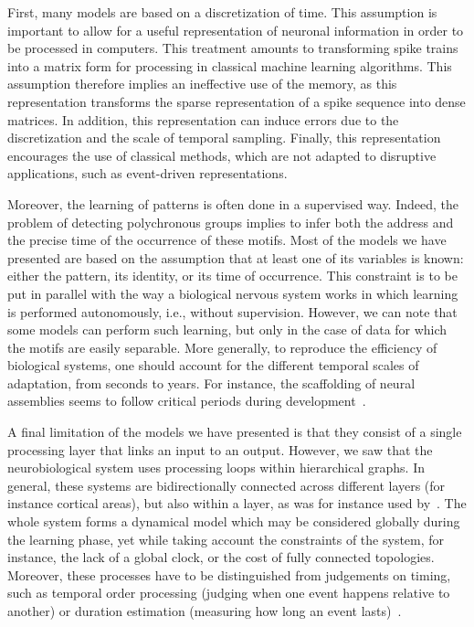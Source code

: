 \documentclass[brainsci, %
               review,accept,pdftex,moreauthors
               ]{Definitions/mdpi}
\begin{document}
First, many models are based on a discretization of time. This assumption is important to allow for a useful representation of neuronal information in order to be processed in computers. This treatment amounts to transforming spike trains into a matrix form for processing in classical machine learning algorithms. This assumption therefore implies an ineffective use of the memory, as this representation transforms the sparse representation of a spike sequence into dense matrices. In addition, this representation can induce errors due to the discretization and the scale of temporal sampling. Finally, this representation encourages the use of classical methods, which are not adapted to disruptive applications, such as event-driven representations.

Moreover, the learning of patterns is often done in a supervised way. Indeed, the problem of detecting polychronous groups implies to infer both the address and the precise time of the occurrence of these motifs. Most of the models we have presented are based on the assumption that at least one of its variables is known: either the pattern, its identity, or its time of occurrence. This constraint is to be put in parallel with the way a biological nervous system works in which learning is performed autonomously, i.e., without supervision. However, we can note that some models can perform such learning, but only in the case of data for which the motifs are easily separable. More generally, to reproduce the efficiency of biological systems, one should account for the different temporal scales of adaptation, from seconds to years. For instance, the scaffolding of neural assemblies seems to follow critical periods during development~\citep{dard_rapid_2022}.

A final limitation of the models we have presented is that they consist of a single processing layer that links an input to an output. However, we saw that the neurobiological system uses processing loops within hierarchical graphs. In general, these systems are bidirectionally connected across different layers (for instance cortical areas), but also within a layer, as was for instance used by~\citet{izhikevich_polychronization_2006}. The whole system forms a dynamical model which may be considered globally during the learning phase, yet while taking account the constraints of the system, for instance, the lack of a global clock, or the cost of fully connected topologies. Moreover,  these processes have to be distinguished from judgements on timing, such as temporal order processing (judging when one event happens relative to another) or duration estimation (measuring how long an event lasts)~\citep{coull_distinction_2022}.
%
\end{document}
